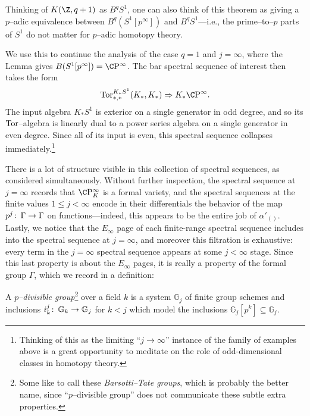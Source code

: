 \begin{remark}
Thinking of \(K(\Z, q+1)\) as \(B^q S^1\), one can also think of this theorem as giving a \(p\)--adic equivalence between \(B^q(S^1[p^\infty])\) and \(B^q S^1\)---i.e., the prime--to--\(p\) parts of \(S^1\) do not matter for \(p\)--adic homotopy theory.
\end{remark}

We use this to continue the analysis of the case \(q = 1\) and \(j = \infty\), where the Lemma gives \(B(S^1[p^\infty]) = \CP^\infty\).  The bar spectral sequence of interest then takes the form \[\Tor^{K_* S^1}_{*, *}(K_*, K_*) \Rightarrow K_* \CP^\infty.\]  The input algebra \(K_* S^1\) is exterior on a single generator in odd degree, and so its \(\operatorname{Tor}\)--algebra is linearly dual to a power series algebra on a single generator in even degree.  Since all of its input is even, this spectral sequence collapses immediately.\footnote{Thinking of this as the limiting ``\(j \to \infty\)'' instance of the family of examples above is a great opportunity to meditate on the role of odd-dimensional classes in homotopy theory.}

There is a lot of structure visible in this collection of spectral sequences, as considered simultaneously.  Without further inspection, the spectral sequence at \(j = \infty\) records that \(\CP^\infty_K\) is a formal variety, and the spectral sequences at the finite values \(1 \le j < \infty\) encode in their differentials the behavior of the map \(p^j\colon\thinspace \Gamma \to \Gamma\) on functions---indeed, this appears to be the entire job of \(\alpha'_{()}\).  Lastly, we notice that the \(E_\infty\) page of each finite-range spectral sequence includes into the spectral sequence at \(j = \infty\), and moreover this filtration is exhaustive: every term in the \(j = \infty\) spectral sequence appears at some \(j < \infty\) stage.  Since this last property is about the \(E_\infty\) pages, it is really a property of the formal group \(\Gamma\), which we record in a definition:

\begin{definition}\label{DefnPDivGp}
A \textit{\(p\)--divisible group}\footnote{Some like to call these \textit{Barsotti--Tate groups}, which is probably the better name, since ``\(p\)--divisible group'' does not communicate these subtle extra properties.} over a field \(k\) is a system \(\mathbb G_j\) of finite group schemes and inclusions \(i_k^j\colon\thinspace \mathbb G_k \to \mathbb G_j\) for \(k < j\) which model the inclusions \(\mathbb G_j[p^k] \subseteq \mathbb G_j\).
\end{definition}

